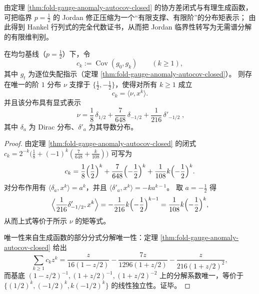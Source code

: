 由定理 \ref{thm:fold-gauge-anomaly-autocov-closed} 的协方差闭式与有理生成函数，可把临界 \(p=\tfrac12\) 的 Jordan 修正压缩为一个“有限支撑、有限阶”的分布矩表示；
由此得到 Hankel 行列式的完全代数证书，从而把 Jordan 临界性转写为无需谱分解的有限维判别。

\begin{proposition}[协方差核的分布矩表示]\label{prop:fold-gauge-anomaly-covariance-distribution-moment}
在均匀基线（\(p=\tfrac12\)）下，令
\[
c_k:=\operatorname{Cov}(g_0,g_k)\qquad(k\ge 1),
\]
其中 \(g_t\) 为逐位失配指示（定理 \ref{thm:fold-gauge-anomaly-autocov-closed}）。
则存在唯一的阶 \(1\) 分布 \(\nu\) 支撑于 \(\{\tfrac12,-\tfrac12\}\)，使得对所有 \(k\ge 1\) 成立
\[
c_k=\langle \nu, x^k\rangle.
\]
并且该分布具有显式表示
\[
\boxed{\;
\nu=\frac18\,\delta_{1/2}+\frac{7}{648}\,\delta_{-1/2}+\frac{1}{216}\,\delta'_{-1/2}\; } ,
\]
其中 \(\delta_a\) 为 Dirac 分布、\(\delta'_a\) 为其导数分布。
\end{proposition}

\begin{proof}
由定理 \ref{thm:fold-gauge-anomaly-autocov-closed} 的闭式
\(
c_k=2^{-k}\bigl(\tfrac18+(-1)^k(\tfrac{7}{648}+\tfrac{k}{108})\bigr)
\)
可写为
\[
c_k=\frac18\Bigl(\frac12\Bigr)^k+\frac{7}{648}\Bigl(-\frac12\Bigr)^k+\frac{1}{108}k\Bigl(-\frac12\Bigr)^k.
\]
对分布作用有 \(\langle\delta_a,x^k\rangle=a^k\)，并且
\(
\langle \delta'_a,x^k\rangle=-k a^{k-1}
\)。
取 \(a=-\tfrac12\) 得
\[
\Bigl\langle \frac{1}{216}\delta'_{-1/2},x^k\Bigr\rangle
=-\frac{1}{216}k\Bigl(-\frac12\Bigr)^{k-1}
=\frac{1}{108}k\Bigl(-\frac12\Bigr)^k,
\]
从而上式等价于所示 \(\nu\) 的矩等式。
\par
唯一性来自生成函数的部分分式分解唯一性：定理 \ref{thm:fold-gauge-anomaly-autocov-closed} 给出
\[
\sum_{k\ge 1}c_k z^k
=\frac{z}{16(1-z/2)}-\frac{7z}{1296(1+z/2)}-\frac{z}{216(1+z/2)^2},
\]
而基底 \((1-z/2)^{-1},(1+z/2)^{-1},(1+z/2)^{-2}\) 上的分解系数唯一，等价于
\(\bigl\{(1/2)^k,(-1/2)^k,k(-1/2)^k\bigr\}\) 的线性独立性。证毕。
\end{proof}


